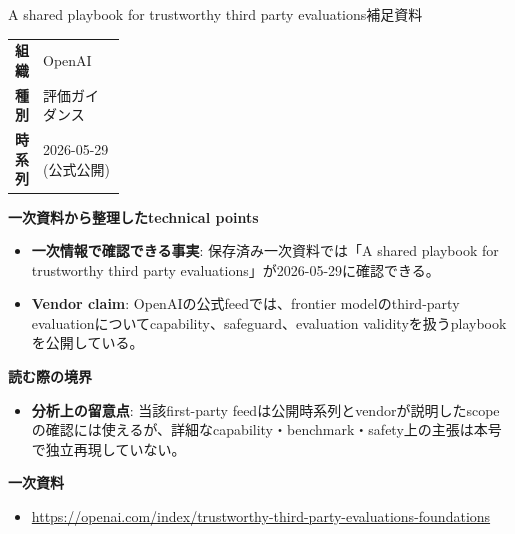 \begin{technicalnote}{A shared playbook for trustworthy third party evaluations}{補足資料}
\begingroup
\begin{tabularx}{\linewidth}{@{}>{\bfseries}p{0.22\linewidth}X@{}}
組織 & OpenAI \\
種別 & 評価ガイダンス \\
時系列 & 2026-05-29 (公式公開) \\
\end{tabularx}
\smallskip
{\bfseries 一次資料から整理したtechnical points}
\begin{itemize}[leftmargin=1.5em,itemsep=0.35em]
\item \textbf{一次情報で確認できる事実}: 保存済み一次資料では「A shared playbook for trustworthy third party evaluations」が2026-05-29に確認できる。
\item \textbf{Vendor claim}: OpenAIの公式feedでは、frontier modelのthird-party evaluationについてcapability、safeguard、evaluation validityを扱うplaybookを公開している。
\end{itemize}
{\bfseries 読む際の境界}
\begin{itemize}[leftmargin=1.5em,itemsep=0.35em]
\item \textbf{分析上の留意点}: 当該first-party feedは公開時系列とvendorが説明したscopeの確認には使えるが、詳細なcapability・benchmark・safety上の主張は本号で独立再現していない。
\end{itemize}
\begin{samepage}
{\bfseries 一次資料}
\begingroup\sloppy
\begin{itemize}[leftmargin=1.5em,itemsep=0.25em]
\item {\scriptsize\url{https://openai.com/index/trustworthy-third-party-evaluations-foundations}}
\end{itemize}
\endgroup
\end{samepage}
\endgroup
\end{technicalnote}
\medskip
